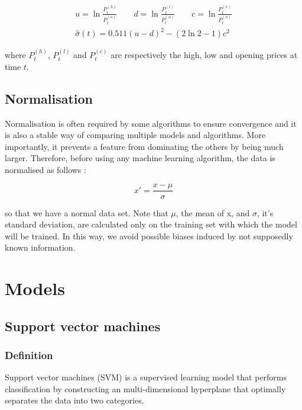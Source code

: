 \documentclass[11pt,a4paper,oneside]{book}
\begin{document}
\begin{equation}
\begin{matrix}
u = \ln\frac{P_t^{(h)}}{P_t^{(o)}} \qquad
d = \ln\frac{P_t^{(l)}}{P_t^{(o)}} \qquad
c = \ln\frac{P_t^{(c)}}{P_t^{(o)}} \\
\hat{\sigma}\left ( t \right ) = 0.511\left ( u - d \right )^2 - \left ( 2\ln 2 - 1 \right )c^2
\end{matrix}
\end{equation}

where $P_t^{(h)}$, $P_t^{(l)}$ and $P_t^{(c)}$ are respectively the high, low and opening prices at time $t$.


\subsection{Normalisation}

Normalisation is often required by some algorithms to ensure convergence and it is also a stable way of comparing multiple models and algorithms. More importantly, it prevents a feature from dominating the others by being much larger. Therefore, before using any machine learning algorithm, the data is normalised as follows : 

\begin{equation}
{x}' = \frac{x - \mu }{\sigma }
\end{equation}

so that we have a normal data set. Note that $\mu$, the mean of x, and $\sigma$, it's standard deviation, are calculated only on the training set with which the model will be trained. In this way, we avoid possible biases induced by not supposedly known information.




\section{Models}

\subsection{Support vector machines}

\subsubsection{Definition}

Support vector machines (SVM) is a supervised learning model that performs classification by constructing an multi-dimensional hyperplane that optimally separates the data into two categories. 
\end{document}
